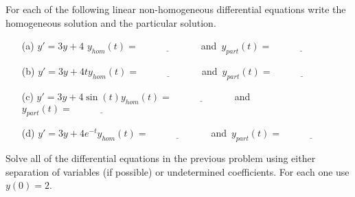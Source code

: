\begin{problem}\label{prob:undet_coeff}
    For each of the following linear non-homogeneous differential equations write the homogeneous solution and the particular solution. 
    \begin{enumerate}
        \item[(a)] $y' = 3y + 4$ \qquad $y_{hom}(t) = \underline{\hspace{1in}}$\, and\, $y_{part}(t) = \underline{\hspace{1in}}$
        \item[(b)] $y' = 3y + 4t$\qquad $y_{hom}(t) = \underline{\hspace{1in}}$\, and\, $y_{part}(t) = \underline{\hspace{1in}}$
        \item[(c)] $y' = 3y + 4\sin(t)$\qquad $y_{hom}(t) = \underline{\hspace{1in}}$\,
            and\, $y_{part}(t) = \underline{\hspace{1in}}$
        \item[(d)] $y' = 3y + 4e^{-t}$\qquad $y_{hom}(t) = \underline{\hspace{1in}}$\,
            and\, $y_{part}(t) = \underline{\hspace{1in}}$
    \end{enumerate}
\end{problem}


\begin{problem}
    Solve all of the differential equations in the previous problem using either
    separation of variables (if possible) or undetermined coefficients. For each one use
    $y(0) = 2$.
\end{problem}

